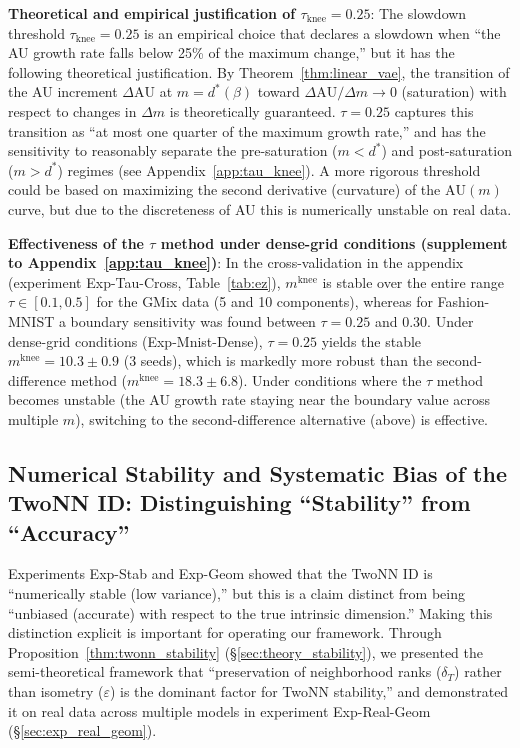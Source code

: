 \documentclass[make,article,submit,pdftex,moreauthors]{Definitions/mdpi}
\newcommand{\mknee}{m^{\mathrm{knee}}}
\begin{document}
\textbf{Theoretical and empirical justification of $\tau_{\mathrm{knee}} = 0.25$}:
The slowdown threshold $\tau_{\mathrm{knee}} = 0.25$ is an empirical choice that declares
a slowdown when ``the AU growth rate falls below 25\% of the maximum change,'' but it has
the following theoretical justification.
By Theorem~\ref{thm:linear_vae}, the transition of the AU increment $\Delta\mathrm{AU}$
at $m = d^*(\beta)$ toward $\Delta\mathrm{AU}/\Delta m \to 0$ (saturation) with respect to
changes in $\Delta m$ is theoretically guaranteed.
$\tau = 0.25$ captures this transition as ``at most one quarter of the maximum growth
rate,'' and has the sensitivity to reasonably separate the pre-saturation ($m < d^*$)
and post-saturation ($m > d^*$) regimes (see Appendix~\ref{app:tau_knee}).
A more rigorous threshold could be based on maximizing the second derivative (curvature)
of the $\mathrm{AU}(m)$ curve, but due to the discreteness of AU this is numerically
unstable on real data.

\textbf{Effectiveness of the $\tau$ method under dense-grid conditions (supplement to
Appendix~\ref{app:tau_knee})}:
In the cross-validation in the appendix (experiment Exp-Tau-Cross, Table~\ref{tab:ez}),
$\mknee$ is stable over the entire range $\tau \in [0.1, 0.5]$ for the GMix data (5 and
10 components), whereas for Fashion-MNIST a boundary sensitivity was found between
$\tau = 0.25$ and $0.30$.
Under dense-grid conditions (Exp-Mnist-Dense), $\tau = 0.25$ yields the stable
$\mknee = 10.3 \pm 0.9$ (3 seeds), which is markedly more robust than the second-difference
method ($\mknee = 18.3 \pm 6.8$).
Under conditions where the $\tau$ method becomes unstable (the AU growth rate staying
near the boundary value across multiple $m$), switching to the second-difference
alternative (above) is effective.

\subsection{Numerical Stability and Systematic Bias of the TwoNN ID: Distinguishing ``Stability'' from ``Accuracy''}\label{sec:disc_twonn_bias}

Experiments Exp-Stab and Exp-Geom showed that the TwoNN ID is ``numerically stable
(low variance),'' but this is a claim distinct from being ``unbiased (accurate) with
respect to the true intrinsic dimension.''
Making this distinction explicit is important for operating our framework.
Through Proposition~\ref{thm:twonn_stability} (\S\ref{sec:theory_stability}), we
presented the semi-theoretical framework that ``preservation of neighborhood ranks
($\delta_T$) rather than isometry ($\varepsilon$) is the dominant factor for TwoNN
stability,'' and demonstrated it on real data across multiple models in experiment
Exp-Real-Geom (\S\ref{sec:exp_real_geom}).
\end{document}
